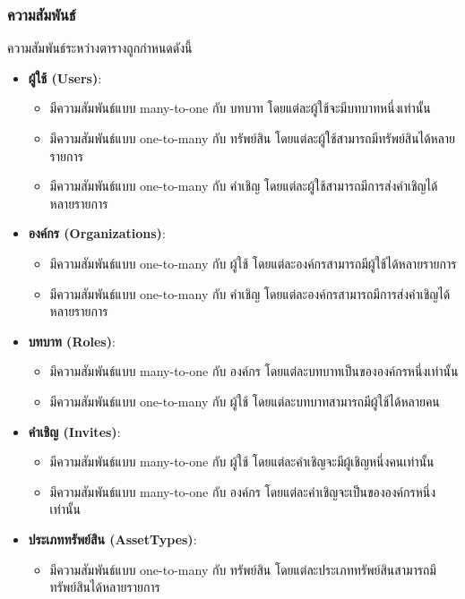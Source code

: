 \subsubsection{ความสัมพันธ์}
ความสัมพันธ์ระหว่างตารางถูกกำหนดดังนี้
\begin{itemize}
    \item \textbf{ผู้ใช้ (Users)}: 
        \begin{itemize} 
            \item มีความสัมพันธ์แบบ many-to-one กับ บทบาท โดยแต่ละผู้ใช้จะมีบทบาทหนึ่งเท่านั้น
            \item มีความสัมพันธ์แบบ one-to-many กับ ทรัพย์สิน โดยแต่ละผู้ใช้สามารถมีทรัพย์สินได้หลายรายการ
            \item มีความสัมพันธ์แบบ one-to-many กับ คำเชิญ โดยแต่ละผู้ใช้สามารถมีการส่งคำเชิญได้หลายรายการ
        \end{itemize}
    \item \textbf{องค์กร (Organizations)}:
        \begin{itemize}
            \item มีความสัมพันธ์แบบ one-to-many กับ ผู้ใช้ โดยแต่ละองค์กรสามารถมีผู้ใช้ได้หลายรายการ
            \item มีความสัมพันธ์แบบ one-to-many กับ คำเชิญ โดยแต่ละองค์กรสามารถมีการส่งคำเชิญได้หลายรายการ
        \end{itemize}
    \item \textbf{บทบาท (Roles)}:
        \begin{itemize}
            \item มีความสัมพันธ์แบบ many-to-one กับ องค์กร โดยแต่ละบทบาทเป็นขององค์กรหนึ่งเท่านั้น
            \item มีความสัมพันธ์แบบ one-to-many กับ ผู้ใช้ โดยแต่ละบทบาทสามารถมีผู้ใช้ได้หลายคน
        \end{itemize}
    \item \textbf{คำเชิญ (Invites)}:
        \begin{itemize}
            \item มีความสัมพันธ์แบบ many-to-one กับ ผู้ใช้ โดยแต่ละคำเชิญจะมีผู้เชิญหนึ่งคนเท่านั้น
            \item มีความสัมพันธ์แบบ many-to-one กับ องค์กร โดยแต่ละคำเชิญจะเป็นขององค์กรหนึ่งเท่านั้น
        \end{itemize}
    \item \textbf{ประเภททรัพย์สิน (AssetTypes)}:
        \begin{itemize}
            \item มีความสัมพันธ์แบบ one-to-many กับ ทรัพย์สิน โดยแต่ละประเภททรัพย์สินสามารถมีทรัพย์สินได้หลายรายการ

\end{itemize}
\end{itemize}
